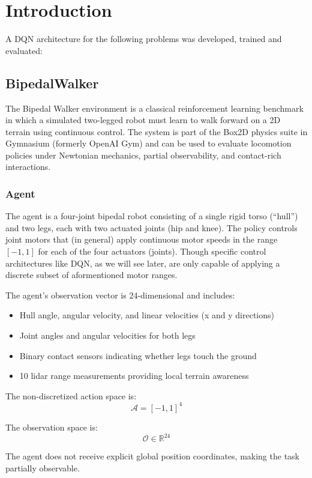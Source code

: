 \section{Introduction}

A DQN architecture for the following problems was developed, trained and evaluated:

\subsection{BipedalWalker}

The Bipedal Walker environment is a classical reinforcement learning benchmark in which a simulated two-legged robot must learn to walk forward on a 2D terrain using continuous control. The system is part of the Box2D physics suite in Gymnasium (formerly OpenAI Gym) and can be used to evaluate locomotion policies under Newtonian mechanics, partial observability, and contact-rich interactions.

\subsubsection{Agent}

The agent is a four-joint bipedal robot consisting of a single rigid torso (“hull”) and two legs, each with two actuated joints (hip and knee). The policy controls joint motors that (in general) apply continuous motor speeds in the range $[-1, 1]$ for each of the four actuators (joints). Though specific control architectures like DQN, as we will see later, are only capable of applying a discrete subset of aformentioned motor ranges.

The agent’s observation vector is 24-dimensional and includes:
\begin{itemize}
    \item Hull angle, angular velocity, and linear velocities (x and y directions)
    \item Joint angles and angular velocities for both legs
    \item Binary contact sensors indicating whether legs touch the ground
    \item 10 lidar range measurements providing local terrain awareness
\end{itemize}

The non-discretized action space is:
\[
\mathcal{A} = [-1,1]^4
\]

The observation space is:
\[
\mathcal{O} \in \mathbb{R}^{24}
\]

The agent does not receive explicit global position coordinates, making the task partially observable.


